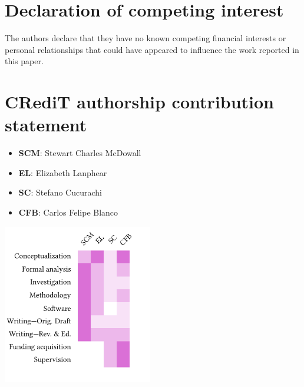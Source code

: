 \documentclass[a4paper,fleqn]{cas-dc}
\begin{document}
\section*{Declaration of competing interest}
The authors declare that they have no known competing financial interests or personal relationships that could have appeared to influence the work reported in this paper.

\printcredits


\section*{CRediT authorship contribution statement}

\begin{itemize}[noitemsep]
	\item \textbf{SCM}: Stewart Charles McDowall
	\item \textbf{EL}: Elizabeth Lanphear
	\item \textbf{SC}: Stefano Cucurachi
	\item \textbf{CFB}: Carlos Felipe Blanco
\end{itemize}

\includegraphics[width=\columnwidth, height=7cm, keepaspectratio]{figs/T-reX_credit_heatmap.pdf}
\end{document}
